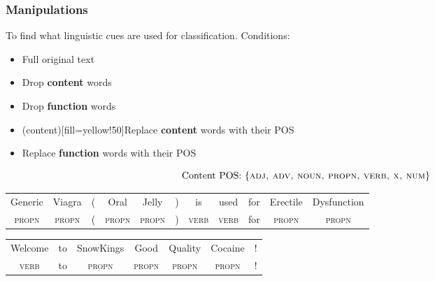 \documentclass[t,xcolor={svgnames,table},aspectratio=169]{beamer}
\begin{document}
\begin{frame}
	\frametitle{Manipulations}
	\Large
	To find what linguistic cues are used for classification.
	\pause
	Conditions:
	\vfill
	
	\begin{itemize}\setlength\itemsep{1em}
	    \item Full original text
	\end{itemize}
	\vspace{1em}
	
	\begin{minipage}{.35\textwidth}
	\begin{itemize}\setlength\itemsep{1em}
		\item Drop \textbf{content} words
		\item Drop \textbf{function} words
	\end{itemize}
	\end{minipage}
	\begin{minipage}{.59\textwidth}
	\begin{itemize}\setlength\itemsep{1em}
		\item {}(content)[fill=yellow!50]{Replace \textbf{content} words with their POS}
		\item Replace \textbf{function} words with their POS
	\end{itemize}
	\end{minipage}
	\vfill
	
    \[\text{Content POS: }\{\textsc{adj, adv, noun, propn, verb, x, num}\}\]
	\vfill
	\pause
	
	{\color{green}
	\setlength{\tabcolsep}{4.5pt}
	\begin{tabular}{ccccccccccc}
	Generic&Viagra&(&Oral&Jelly&)&is&used&for&Erectile&Dysfunction\\
	\rowcolor{yellow!50}
	\small\textsc{propn} & \small\textsc{propn} &(& \small\textsc{propn} & \small\textsc{propn} &)& \small\textsc{verb} & \small\textsc{verb} & for & \small\textsc{propn} & \small\textsc{propn}
	\end{tabular}}
	\vfill
	
	{\color{red}
	\setlength{\tabcolsep}{12.5pt}
	\begin{tabular}{ccccccc}
	Welcome&to&SnowKings&Good&Quality&Cocaine&!\\
	\rowcolor{yellow!50}
	\small\textsc{verb} & to & \small\textsc{propn} & \small\textsc{propn} & \small\textsc{propn} & \small\textsc{propn} & !
	\end{tabular}}
\end{frame}
\end{document}
